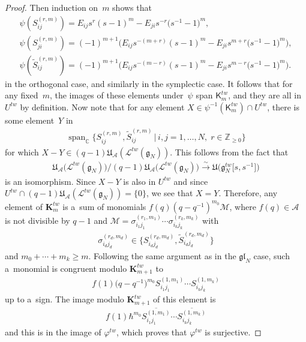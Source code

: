 \documentclass[pdftex]{sigma}
\numberwithin{theorem}{section}
\numberwithin{proposition}{section}
\numberwithin{lemma}{section}
\numberwithin{corollary}{section}
\numberwithin{definition}{section}
\numberwithin{example}{section}
\numberwithin{remark}{section}
\numberwithin{note}{section}
\numberwithin{equation}{section}
\begin{document}
\begin{proof}
Then induction on~$m$ shows that
\begin{gather*}
\psi(S_{ij}^{(r,m)})=E_{ij}s^r(s-1)^m - E_{ji}s^{-r}\big(s^{-1}-1\big)^m,\\
\psi(S_{ji}^{(r,m)})=(-1)^{m+1}\big(E_{ij}s^{-(m+r)}(s-1)^m - E_{ji}s^{m+r}\big(s^{-1}-1\big)^m\big),\\
\psi(\widetilde{S}_{ij}^{(r,m)})=(-1)^{m+1}\big(E_{ij}s^{-(m-r)}(s-1)^m - E_{ji}s^{m-r}\big(s^{-1}-1\big)^m\big).
\end{gather*}
in the orthogonal case, and similarly in the symplectic case.
It follows that for any f\/ixed~$m$, the images of these elements under~$\psi$ span $\mathsf{K}_m^{tw}$, and they are all
in $U^{tw}$ by def\/inition.
Now note that for any element $X \in \psi^{-1}(\mathsf{K}_m^{tw}) \cap U^{tw}$, there is some element~$Y$ in
 \begin{gather*}
 \operatorname{span}_{\mathbb{C}} \big\{S_{ij}^{(r,m)},\widetilde{S}_{ij}^{(r,m)} \,|\, i,j=1,\ldots,N,\; r \in \mathbb{Z}_{\ge 0}\big\}
 \end{gather*}
for which $X-Y \in (q-1)\mathfrak{U}_{\mathcal{A}}(\mathcal{L}^{tw}(\mathfrak{g}_N))$.
This follows from the fact that
\begin{gather*}
\mathfrak{U}_{\mathcal{A}}\big(\mathcal{L}^{tw}(\mathfrak{g}_N)\big)/(q-1)\mathfrak{U}_{\mathcal{A}}\big(\mathcal{L}^{tw}(\mathfrak{g}_N)\big)
\stackrel{\sim}{\longrightarrow} \mathfrak{U}\big(\mathfrak{g}_N^{tw}\big[s,s^{-1}\big]\big)
\end{gather*}
is an isomorphism.
Since $X-Y$ is also in $U^{tw}$ and since $U^{tw} \cap
(q-1)\mathfrak{U}_{\mathcal{A}}(\mathcal{L}^{tw}(\mathfrak{g}_N))=\{0\}$, we see that $X=Y$.
Therefore, any element of $\mathbf{K}_m^{tw}$ is a~sum of monomials $f(q)(q-q^{-1})^{m_0}\mathcal{M}$, where $f(q) \in
\mathcal{A}$ is not divisible by $q-1$ and $\mathcal{M}=\sigma_{i_1 j_1}^{(r_1,m_1)} \cdots \sigma_{i_k j_k}^{(r_k,m_k)}$ with
\begin{gather*}
\sigma_{i_d j_d}^{(r_d,m_d)} \in \big\{S_{i_d j_d}^{(r_d,m_d)},\widetilde{S}_{i_d j_d}^{(r_d,m_d)}\big\}
\end{gather*}
and $m_0+\cdots+m_k \geq m$.
Following the same argument as in the $\mathfrak{gl}_N$ case, such a~monomial is congruent modulo
$\mathbf{K}_{m+1}^{tw}$ to
\begin{gather*}
f(1)\big(q-q^{-1}\big)^{m_0}S_{i_1 j_1}^{(1,m_1)} \cdots S_{i_k j_k}^{(1,m_k)}
\end{gather*}
up to a~sign.
The image modulo $\mathbf{K}_{m+1}^{tw}$ of this element is
\begin{gather*}
f(1)\hbar^{m_0}\overline{S_{i_1 j_1}^{(1,m_1)}} \cdots \overline{S_{i_k j_k}^{(1,m_k)}}
\end{gather*}
and this is in the image of $\varphi^{tw}$, which proves that $\varphi^{tw}$ is surjective.
\end{proof}
\end{document}
